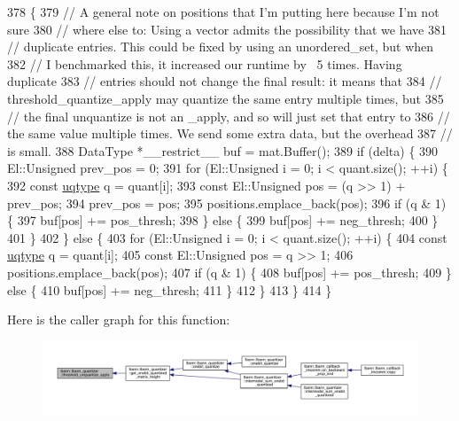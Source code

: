 \begin{DoxyCode}
378                                                                      \{
379   \textcolor{comment}{// A general note on positions that I'm putting here because I'm not sure}
380   \textcolor{comment}{// where else to: Using a vector admits the possibility that we have}
381   \textcolor{comment}{// duplicate entries. This could be fixed by using an unordered\_set, but when}
382   \textcolor{comment}{// I benchmarked this, it increased our runtime by ~5 times. Having duplicate}
383   \textcolor{comment}{// entries should not change the final result: it means that}
384   \textcolor{comment}{// threshold\_quantize\_apply may quantize the same entry multiple times, but}
385   \textcolor{comment}{// the final unquantize is not an \_apply, and so will just set that entry to}
386   \textcolor{comment}{// the same value multiple times. We send some extra data, but the overhead}
387   \textcolor{comment}{// is small.}
388   DataType *\_\_restrict\_\_ buf = mat.Buffer();
389   \textcolor{keywordflow}{if} (delta) \{
390     El::Unsigned prev\_pos = 0;
391     \textcolor{keywordflow}{for} (El::Unsigned i = 0; i < quant.size(); ++i) \{
392       \textcolor{keyword}{const} \hyperlink{classlbann_1_1lbann__quantizer_ac8b63c86fc871e248ce20c7af19a7fad}{uqtype} q = quant[i];
393       \textcolor{keyword}{const} El::Unsigned pos = (q >> 1) + prev\_pos;
394       prev\_pos = pos;
395       positions.emplace\_back(pos);
396       \textcolor{keywordflow}{if} (q & 1) \{
397         buf[pos] += pos\_thresh;
398       \} \textcolor{keywordflow}{else} \{
399         buf[pos] += neg\_thresh;
400       \}
401     \}
402   \} \textcolor{keywordflow}{else} \{
403     \textcolor{keywordflow}{for} (El::Unsigned i = 0; i < quant.size(); ++i) \{
404       \textcolor{keyword}{const} \hyperlink{classlbann_1_1lbann__quantizer_ac8b63c86fc871e248ce20c7af19a7fad}{uqtype} q = quant[i];
405       \textcolor{keyword}{const} El::Unsigned pos = q >> 1;
406       positions.emplace\_back(pos);
407       \textcolor{keywordflow}{if} (q & 1) \{
408         buf[pos] += pos\_thresh;
409       \} \textcolor{keywordflow}{else} \{
410         buf[pos] += neg\_thresh;
411       \}
412     \}
413   \}
414 \}
\end{DoxyCode}
Here is the caller graph for this function\+:\nopagebreak
\begin{figure}[H]
\begin{center}
\leavevmode
\includegraphics[width=350pt]{classlbann_1_1lbann__quantizer_ab12b432ba2901347b025e8b6ec40a3c6_icgraph}
\end{center}
\end{figure}


